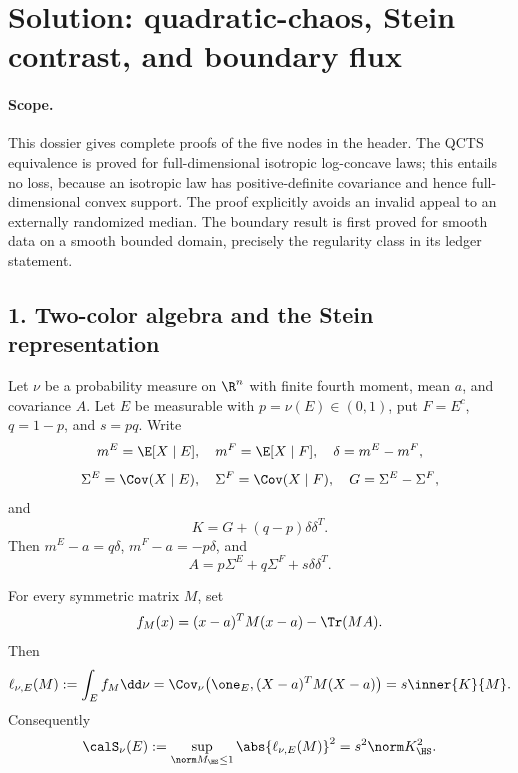 \documentclass[../main.tex]{subfiles}
\begin{document}
%
\section*{Solution: quadratic-chaos, Stein contrast, and boundary flux}
\label{sec:sol-kls-qcts-stein-boundary-core}

\paragraph{Scope.}
This dossier gives complete proofs of the five nodes in the header.  The QCTS equivalence is
proved for full-dimensional isotropic log-concave laws; this entails no loss, because an
isotropic law has positive-definite covariance and hence full-dimensional convex support.
The proof explicitly avoids an invalid appeal to an externally randomized median.  The
boundary result is first proved for smooth data on a smooth bounded domain, precisely the
regularity class in its ledger statement.

\subsection*{1. Two-color algebra and the Stein representation}

Let $\nu$ be a probability measure on $\R^n$ with finite fourth moment, mean $a$, and covariance
$A$.  Let $E$ be measurable with $p=\nu(E)\in(0,1)$, put $F=E^c$, $q=1-p$, and $s=pq$.
Write
\[
 m^E=\E[X\mid E],\quad m^F=\E[X\mid F],\quad \delta=m^E-m^F,
\]
\[
 \Sigma^E=\Cov(X\mid E),\quad \Sigma^F=\Cov(X\mid F),\quad
 G=\Sigma^E-\Sigma^F,
\]
and
\[
 K=G+(q-p)\delta\delta^T.
\]
Then $m^E-a=q\delta$, $m^F-a=-p\delta$, and
\begin{equation}\label{eq:sol-stein-cov-decomp}
 A=p\Sigma^E+q\Sigma^F+s\delta\delta^T.
\end{equation}

\begin{proposition}[= Proposition~\ref{prop:stein-rep}]
\label{prop:sol-stein-rep}
For every symmetric matrix $M$, set
\[
 f_M(x)=(x-a)^TM(x-a)-\Tr(MA).
\]
Then
\begin{equation}\label{eq:sol-stein-rep}
 \ell_{\nu,E}(M):=\int_Ef_M\dd\nu
 =\Cov_\nu\!\left(\one_E,(X-a)^TM(X-a)\right)
 =s\inner{K}{M}.
\end{equation}
Consequently
\begin{equation}\label{eq:sol-stein-norm}
 \calS_\nu(E):=\sup_{\norm M_\HS\le1}\abs{\ell_{\nu,E}(M)}^2
 =s^2\norm K_\HS^2.
\end{equation}
\end{proposition}
\end{document}
